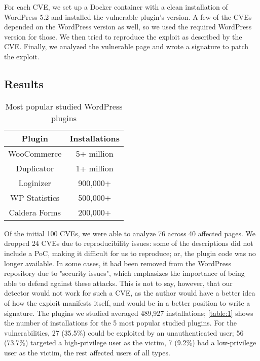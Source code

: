 For each CVE, we set up a Docker container with a clean installation of WordPress 5.2 and installed the vulnerable plugin's version. A few of the CVEs depended on the WordPress version as well, so we used the required WordPress version for those. We then tried to reproduce the exploit as described by the CVE. Finally, we analyzed the vulnerable page and wrote a signature to patch the exploit.

\subsection{Results}

\begin{table}[h!]
	\begin{center}
		\begin{tabular}{|c c|} 
			\hline
			Plugin & Installations\\ [1ex] 
			\hline
			WooCommerce  & 5+ million  \\  
			Duplicator & 1+ million \\  
			Loginizer & 900,000+ \\  
			WP Statistics & 500,000+ \\  
			Caldera Forms & 200,000+ \\   
			\hline
		\end{tabular}
		\caption{Most popular studied WordPress plugins}
		\label{table:1}
	\end{center}
\end{table}

Of the initial 100 CVEs, we were able to analyze 76 across 40 affected pages. We dropped 24 CVEs due to reproducibility issues: some of the descriptions did not include a PoC, making it difficult for us to reproduce; or, the plugin code was no longer available. In some cases, it had been removed from the WordPress repository due to "security issues", which emphasizes the importance of being able to defend against these attacks. This is not to say, however, that our detector would not work for such a CVE, as the author would have a better idea of how the exploit manifests itself, and would be in a better position to write a signature. The plugins we studied averaged 489,927 installations; \autoref{table:1} shows the number of installations for the 5 most popular studied plugins. For the vulnerabilities, 27 (35.5\%) could be exploited by an unauthenticated user; 56 (73.7\%) targeted a high-privilege user as the victim, 7 (9.2\%) had a low-privilege user as the victim, the rest affected users of all types.

